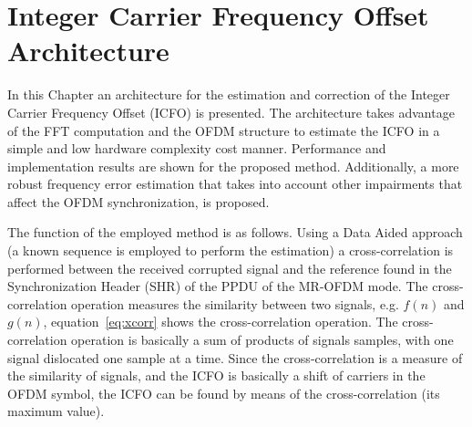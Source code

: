 \chapter{Integer Carrier Frequency Offset Architecture}


\label{sec:fft_cfo_architecture}

In this Chapter an architecture for the estimation and correction of the Integer Carrier Frequency Offset (ICFO) is presented. The architecture takes advantage of the FFT computation and the OFDM structure to estimate the ICFO in a simple and low hardware complexity cost manner. Performance and implementation results are shown for the proposed method. Additionally, a more robust frequency error estimation that takes into account other impairments that affect  the OFDM synchronization, is proposed. 





The function of the employed method is as follows. Using a Data Aided approach (a known sequence is employed to perform the estimation) a cross-correlation is performed between the received corrupted signal and the reference found in the Synchronization Header (SHR) of the PPDU of the MR-OFDM mode. The cross-correlation operation measures the similarity between two signals, e.g. $f(n)$ and $g(n)$, equation~\ref{eq:xcorr} shows the cross-correlation operation. The cross-correlation operation is basically a sum of products of signals samples, with one signal dislocated one sample at a time. Since the cross-correlation is a measure of the similarity of signals, and the ICFO is basically a shift of carriers in the OFDM symbol, the ICFO can be found by means of the cross-correlation (its maximum value). 




 
